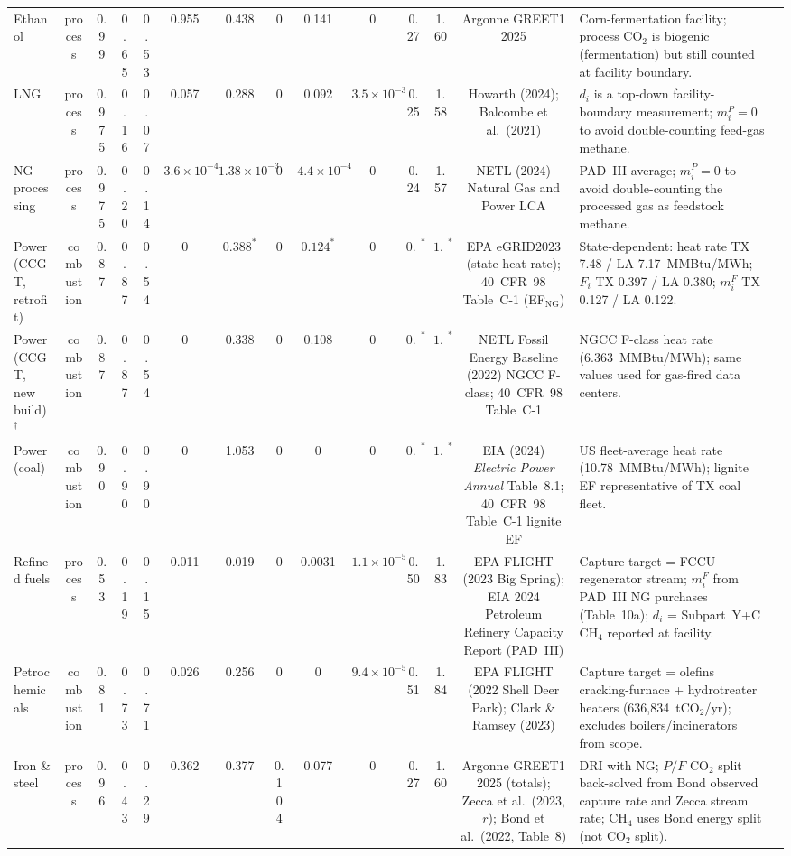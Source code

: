 \documentclass[11pt]{article}
\newcommand{\cotwo}{\ensuremath{\mathrm{CO_2}}}
\begin{document}
\begin{landscape}
\begin{table}[htbp]
\begin{tabular}{@{}p{2.1cm}cccccccccccc>{\raggedright\arraybackslash}p{3.6cm}>{\raggedright\arraybackslash}p{4.3cm}@{}}
Ethanol & process & 0.99 & 0.65 & 0.53 & 0.955 & 0.438 & 0 & 0.141 & 0 & 0.27 & 1.60 & Argonne GREET1 2025 & Corn-fermentation facility; process CO$_2$ is biogenic (fermentation) but still counted at facility boundary. \\
LNG & process & 0.975 & 0.16 & 0.07 & 0.057 & 0.288 & 0 & 0.092 & $3.5{\times}10^{-3}$ & 0.25 & 1.58 & Howarth (2024); Balcombe et al.\ (2021) & $d_i$ is a top-down facility-boundary measurement; $m_i^P = 0$ to avoid double-counting feed-gas methane. \\
NG processing & process & 0.975 & 0.20 & 0.14 & $3.6{\times}10^{-4}$ & $1.38{\times}10^{-3}$ & 0 & $4.4{\times}10^{-4}$ & 0 & 0.24 & 1.57 & NETL (2024) Natural Gas and Power LCA & PAD~III average; $m_i^P = 0$ to avoid double-counting the processed gas as feedstock methane. \\
Power (CCGT, retrofit) & combustion & 0.87 & 0.87 & 0.54 & 0 & $0.388^*$ & 0 & $0.124^*$ & 0 & $0.53^*$ & $1.86^*$ & EPA eGRID2023 (state heat rate); 40~CFR~98 Table~C-1 (EF$_{\text{NG}}$) & State-dependent: heat rate TX 7.48 / LA 7.17~MMBtu/MWh; $F_i$ TX 0.397 / LA 0.380; $m_i^F$ TX 0.127 / LA 0.122. \\
Power (CCGT, new build)$^{\dagger}$ & combustion & 0.87 & 0.87 & 0.54 & 0 & 0.338 & 0 & 0.108 & 0 & $0.53^*$ & $1.86^*$ & NETL Fossil Energy Baseline (2022) NGCC F-class; 40~CFR~98 Table~C-1 & NGCC F-class heat rate (6.363~MMBtu/MWh); same values used for gas-fired data centers. \\
Power (coal) & combustion & 0.90 & 0.90 & 0.90 & 0 & 1.053 & 0 & 0 & 0 & $0.51^*$ & $1.84^*$ & EIA (2024) \emph{Electric Power Annual} Table~8.1; 40~CFR~98 Table~C-1 lignite EF & US fleet-average heat rate (10.78~MMBtu/MWh); lignite EF representative of TX coal fleet. \\
Refined fuels & process & 0.53 & 0.19 & 0.15 & 0.011 & 0.019 & 0 & 0.0031 & $1.1{\times}10^{-5}$ & 0.50 & 1.83 & EPA FLIGHT (2023 Big Spring); EIA 2024 Petroleum Refinery Capacity Report (PAD~III) & Capture target = FCCU regenerator stream; $m_i^F$ from PAD~III NG purchases (Table~10a); $d_i$ = Subpart~Y+C CH$_4$ reported at facility. \\
Petrochemicals & combustion & 0.81 & 0.73 & 0.71 & 0.026 & 0.256 & 0 & 0 & $9.4{\times}10^{-5}$ & 0.51 & 1.84 & EPA FLIGHT (2022 Shell Deer Park); Clark \& Ramsey (2023) & Capture target = olefins cracking-furnace + hydrotreater heaters (636{,}834~t\cotwo{}/yr); excludes boilers/incinerators from scope. \\
Iron \& steel & process & 0.96 & 0.43 & 0.29 & 0.362 & 0.377 & 0.104 & 0.077 & 0 & 0.27 & 1.60 & Argonne GREET1 2025 (totals); Zecca et al.\ (2023, $r$); Bond et al.\ (2022, Table~8) & DRI with NG; $P/F$ CO$_2$ split back-solved from Bond observed capture rate and Zecca stream rate; CH$_4$ uses Bond energy split (not CO$_2$ split). \\

\end{tabular}
\end{table}
\end{landscape}
\end{document}
